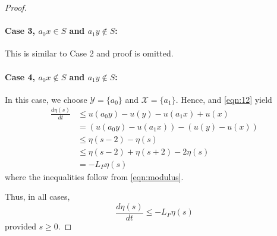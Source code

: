 \begin{proof}
\paragraph{Case 3, $a_0x \in S$ and $a_1y \notin S$:} This is similar to Case 2 and proof is omitted.
\paragraph{Case 4, $a_0x \notin S$ and $a_1y \notin S$:} In this case, we choose $\mathcal{Y} = \{a_0\}$ and $\mathcal{X}=\{a_1\}$. Hence,  and \cref{eqn:12} yield
	\begin{align*}
        \frac{d \eta(s)}{dt} &\leq u(a_0y)-u(y) - u(a_1x) + u(x) \\
        &= \left(u(a_0y)-u(a_1x)\right) - \left(u(y)-u(x)\right) \\
        &\leq \eta(s-2) -\eta(s) \\
        &\leq \eta(s-2) + \eta(s+2) - 2 \eta(s)\\
        &= - L_P\eta(s) 
    \end{align*}
    where the inequalities follow from \cref{eqn:modulus}.
    
    Thus, in all cases, 
    \begin{equation*}
    \frac{d \eta(s)}{dt} \leq -L_P \eta(s)
    \end{equation*}
	provided $s\geq 0$.
\end{proof}

